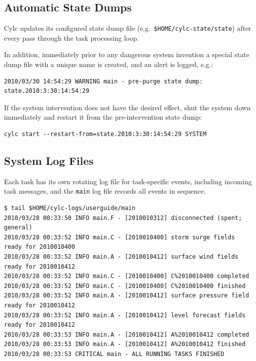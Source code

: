 \documentclass[11pt,a4paper]{article}
\begin{document}
\subsection{Automatic State Dumps}
\label{AutomaticStateDumps}

Cylc updates its configured state dump file (e.g.\
\lstinline=$HOME/cylc-state/state=) after every pass through the task 
processing loop.

In addition, immediately prior to any dangerous system invention a 
special state dump file with a unique name is created, and an alert is
logged, e.g.:

\begin{lstlisting}
2010/03/30 14:54:29 WARNING main - pre-purge state dump: state.2010:3:30:14:54:29
\end{lstlisting}

If the system intervention does not have the desired effect, shut the system 
down immediately and restart it from the pre-intervention state dump:

\begin{lstlisting}
cylc start --restart-from=state.2010:3:30:14:54:29 SYSTEM
\end{lstlisting}

\subsection{System Log Files}
\label{SystemLogFiles}

Each task has its own rotating log file for task-specific events,
including incoming task messages, and the \lstinline=main= log file
records all events in sequence.

\begin{lstlisting}
$ tail $HOME/cylc-logs/userguide/main
2010/03/28 00:33:50 INFO main.F - [2010010312] disconnected (spent; general)
2010/03/28 00:33:52 INFO main.C - [2010010400] storm surge fields ready for 2010010400
2010/03/28 00:33:52 INFO main.A - [2010010412] surface wind fields ready for 2010010412
2010/03/28 00:33:52 INFO main.C - [2010010400] C%2010010400 completed
2010/03/28 00:33:52 INFO main.C - [2010010400] C%2010010400 finished
2010/03/28 00:33:52 INFO main.A - [2010010412] surface pressure field ready for 2010010412
2010/03/28 00:33:52 INFO main.A - [2010010412] level forecast fields ready for 2010010412
2010/03/28 00:33:53 INFO main.A - [2010010412] A%2010010412 completed
2010/03/28 00:33:53 INFO main.A - [2010010412] A%2010010412 finished
2010/03/28 00:33:53 CRITICAL main - ALL RUNNING TASKS FINISHED
\end{lstlisting}
\end{document}
